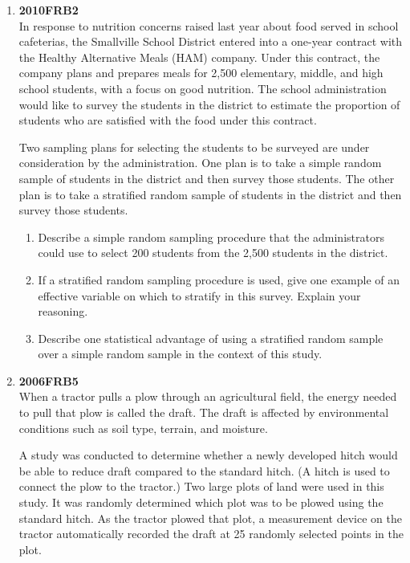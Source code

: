 \documentclass[a4paper,12pt,twoside]{book}
\begin{document}
\begin{enumerate}
\item \textbf{2010FRB2}\\
    In response to nutrition concerns raised last year about food served in school cafeterias, the Smallville School District entered into a one-year contract with the Healthy Alternative Meals (HAM) company. Under this contract, the company plans and prepares meals for 2,500 elementary, middle, and high school students, with a focus on good nutrition. The school administration would like to survey the students in the district to estimate the proportion of students who are satisfied with the food under this contract.
    
Two sampling plans for selecting the students to be surveyed are under consideration by the administration. One plan is to take a simple random sample of students in the district and then survey those students. The other plan is to take a stratified random sample of students in the district and then survey those students.

    \begin{enumerate}[label = (\alph*)]
      \item  Describe a simple random sampling procedure that the administrators could use to select 200 students from the 2,500 students in the district.
      \item If a stratified random sampling procedure is used, give one example of an effective variable on which to stratify in this survey. Explain your reasoning.
      \item Describe one statistical advantage of using a stratified random sample over a simple random sample in the context of this study.
    \end{enumerate}
    \newpage
    
  \item \textbf{2006FRB5}\\
 When a tractor pulls a plow through an agricultural field, the energy needed to pull that plow is called the draft. The draft is affected by environmental conditions such as soil type, terrain, and moisture.
 
A study was conducted to determine whether a newly developed hitch would be able to reduce draft compared to the standard hitch. (A hitch is used to connect the plow to the tractor.) Two large plots of land were used in this study. It was randomly determined which plot was to be plowed using the standard hitch. As the tractor plowed that plot, a measurement device on the tractor automatically recorded the draft at 25 randomly selected points in the plot.


\end{enumerate}
\end{document}
